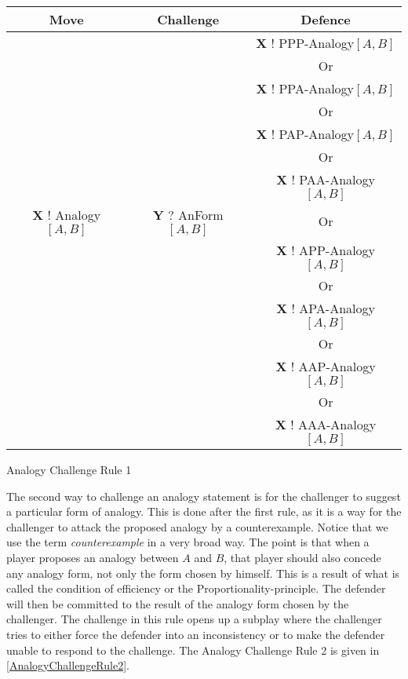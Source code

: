 					\begin{Scheme}[h]      
					\small 		
        			\centering
               		\begin{tabular}{c|c|c}
               			\textbf{Move}        & \textbf{Challenge} & \textbf{Defence} \\ \toprule
               			& & \textbf{X} ! PPP-Analogy$[A,B]$ \\ 
               			& & Or \\
               			& & \textbf{X} ! PPA-Analogy$[A,B]$ \\
               			& & Or \\
               			& & \textbf{X} ! PAP-Analogy$[A,B]$ \\
               			& & Or \\
               			& & \textbf{X} ! PAA-Analogy$[A,B]$ \\
               			\textbf{X} ! Analogy$[A,B]$ & \textbf{Y} ? AnForm$[A,B]$ & Or \\
               			& & \textbf{X} ! APP-Analogy$[A,B]$ \\
               			& & Or \\
               			& & \textbf{X} ! APA-Analogy$[A,B]$ \\
               			& & Or \\
               			& & \textbf{X} ! AAP-Analogy$[A,B]$ \\
               			& & Or \\
               			& & \textbf{X} ! AAA-Analogy$[A,B]$ \\ \bottomrule					
               		\end{tabular}	
               		\caption{Analogy Challenge Rule 1}
                	\label{AnalogyChallengeRule1}
					\end{Scheme} 

			The second way to challenge an analogy statement is for the challenger to suggest a particular form of analogy. This is done after the first rule, as it is a way for the challenger to attack the proposed analogy by a counterexample. Notice that we use the term \textit{counterexample} in a very broad way. The point is that when a player proposes an analogy between $A$ and $B$, that player should also concede any analogy form, not only the form chosen by himself. This is a result of what is called the condition of efficiency or the Proportionality-principle. The defender will then be committed to the result of the analogy form chosen by the challenger. The challenge in this rule opens up a subplay where the challenger tries to either force the defender into an inconsistency or to make the defender unable to respond to the challenge. The Analogy Challenge Rule 2 is given in \autoref{AnalogyChallengeRule2}.
					
